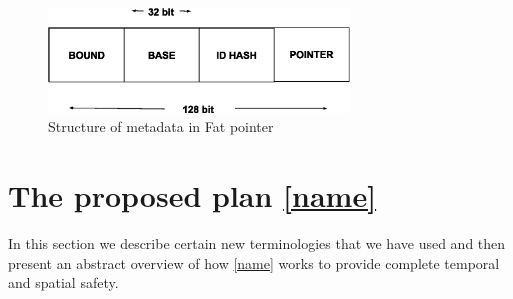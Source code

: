 \begin{figure}
\centering
\captionsetup{justification=centering}
\includegraphics[width=8cm]{fat_pointer.eps}
\caption{Structure of metadata in Fat pointer}
\label{fig: metadata}
\hrulefill
\end{figure}

\section{The proposed plan \ref{name}}
In this section we describe certain new terminologies that we have used and then present an abstract overview of how \ref{name} works to provide complete temporal and spatial safety. 
